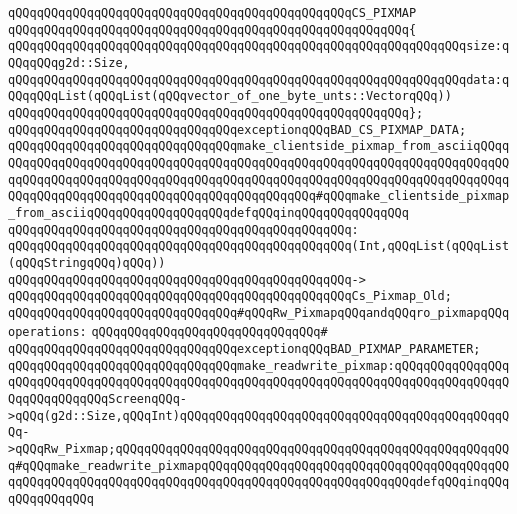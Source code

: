 \verb|qQQqqQQqqQQqqQQqqQQqqQQqqQQqqQQqqQQqqQQqqQQqqQQqCS_PIXMAP|\newline
\verb|qQQqqQQqqQQqqQQqqQQqqQQqqQQqqQQqqQQqqQQqqQQqqQQqqQQqqQQq{|\newline
\verb|qQQqqQQqqQQqqQQqqQQqqQQqqQQqqQQqqQQqqQQqqQQqqQQqqQQqqQQqqQQqqQQqsize:qQQqqQQqg2d::Size,|\newline
\verb|qQQqqQQqqQQqqQQqqQQqqQQqqQQqqQQqqQQqqQQqqQQqqQQqqQQqqQQqqQQqqQQqdata:qQQqqQQqList(qQQqList(qQQqvector_of_one_byte_unts::VectorqQQq))|\newline
\verb|qQQqqQQqqQQqqQQqqQQqqQQqqQQqqQQqqQQqqQQqqQQqqQQqqQQqqQQq};|\newline
\newline
\verb|qQQqqQQqqQQqqQQqqQQqqQQqqQQqqQQqexceptionqQQqBAD_CS_PIXMAP_DATA;|\newline
\newline
\verb|qQQqqQQqqQQqqQQqqQQqqQQqqQQqqQQqmake_clientside_pixmap_from_asciiqQQqqQQqqQQqqQQqqQQqqQQqqQQqqQQqqQQqqQQqqQQqqQQqqQQqqQQqqQQqqQQqqQQqqQQqqQQqqQQqqQQqqQQqqQQqqQQqqQQqqQQqqQQqqQQqqQQqqQQqqQQqqQQqqQQqqQQqqQQqqQQqqQQqqQQqqQQqqQQqqQQqqQQqqQQqqQQqqQQqqQQqqQQq#qQQqmake_clientside_pixmap_from_asciiqQQqqQQqqQQqqQQqqQQqdefqQQqinqQQqqQQqqQQqqQQq|\newline
\verb|qQQqqQQqqQQqqQQqqQQqqQQqqQQqqQQqqQQqqQQqqQQqqQQq:|\newline
\verb|qQQqqQQqqQQqqQQqqQQqqQQqqQQqqQQqqQQqqQQqqQQqqQQq(Int,qQQqList(qQQqList(qQQqStringqQQq)qQQq))|\newline
\verb|qQQqqQQqqQQqqQQqqQQqqQQqqQQqqQQqqQQqqQQqqQQqqQQq->|\newline
\verb|qQQqqQQqqQQqqQQqqQQqqQQqqQQqqQQqqQQqqQQqqQQqqQQqCs_Pixmap_Old;|\newline
\newline
\newline
\verb|qQQqqQQqqQQqqQQqqQQqqQQqqQQqqQQq#qQQqRw_PixmapqQQqandqQQqro_pixmapqQQqoperations:|\newline
\verb|qQQqqQQqqQQqqQQqqQQqqQQqqQQqqQQq#|\newline
\verb|qQQqqQQqqQQqqQQqqQQqqQQqqQQqqQQqexceptionqQQqBAD_PIXMAP_PARAMETER;|\newline
\newline
\verb|qQQqqQQqqQQqqQQqqQQqqQQqqQQqqQQqmake_readwrite_pixmap:qQQqqQQqqQQqqQQqqQQqqQQqqQQqqQQqqQQqqQQqqQQqqQQqqQQqqQQqqQQqqQQqqQQqqQQqqQQqqQQqqQQqqQQqqQQqqQQqqQQqScreenqQQq->qQQq(g2d::Size,qQQqInt)qQQqqQQqqQQqqQQqqQQqqQQqqQQqqQQqqQQqqQQqqQQqqQQq->qQQqRw_Pixmap;qQQqqQQqqQQqqQQqqQQqqQQqqQQqqQQqqQQqqQQqqQQqqQQqqQQqqQQq#qQQqmake_readwrite_pixmapqQQqqQQqqQQqqQQqqQQqqQQqqQQqqQQqqQQqqQQqqQQqqQQqqQQqqQQqqQQqqQQqqQQqqQQqqQQqqQQqqQQqqQQqqQQqqQQqqQQqdefqQQqinqQQqqQQqqQQqqQQq|\newline
